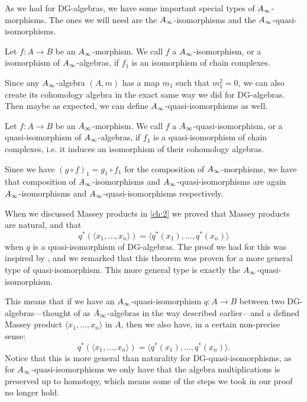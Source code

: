 As we had for DG-algebras, we have some important special types of $\A$-morphisms. The ones we will need are the $\A$-isomorphisms and the $\A$-quasi-isomorphisms.

\begin{definition}[$\A$-isomorphism]
\label{def:A_infinity-isomorphism}
Let $f\colon A\longrightarrow B$ be an $\A$-morphism. We call $f$ a $\A$-isomorphism, or a isomorphism of $\A$-algebras, if $f_1$ is an isomorphism of chain complexes.
\end{definition}

Since any $\A$-algebra $(A, m)$ has a map $m_1$ such that $m_1^2=0$, we can also create its cohomology algebra in the exact same way we did for DG-algebras. Then maybe as expected, we can define $\A$-quasi-isomorphisms as well.

\begin{definition}
\label{def:A_infinity-quasi-isomorphism}
Let $f\colon A\longrightarrow B$ be an $\A$-morphism. We call $f$ a $\A$-quasi-isomorphism, or a quasi-isomorphism of $\A$-algebras, if $f_1$ is a quasi-isomorphism of chain complexes, i.e. it induces an isomorphism of their cohomology algebras. 
\end{definition}

Since we have $(g\circ f)_1 = g_1\circ f_1$ for the composition of $\A$-morphisms, we have that composition of $\A$-isomorphisms and $\A$-quasi-isomorphisms are again $\A$-isomorphisms and $\A$-quasi-isomorphisms respectively.

\begin{remark}
When we discussed Massey products in \cref{ch:2} we proved that Massey products are natural, and that 
\begin{equation*}
	q^*(\langle x_1, \ldots, x_n\rangle ) = \langle q^*(x_1),\ldots, q^*(x_n)\rangle
\end{equation*}
when $q$ is a quasi-isomorphism of DG-algebras. The proof we had for this was inspired by \cite[Theorem 1.5]{naturality}, and we remarked that this theorem was proven for a more general type of quasi-isomorphism. This more general type is exactly the $\A$-quasi-isomorphism.

This means that if we have an $\A$-quasi-isomorphism $q\colon A\longrightarrow B$ between two DG-algebras---thought of as $\A$-algebras in the way described earlier---and a defined Massey product $\langle x_1, \ldots, x_n\rangle$ in $A$, then we also have, in a certain non-precise sense:
\begin{equation*}
	q^*(\langle x_1, \ldots, x_n\rangle ) = \langle q^*(x_1),\ldots, q^*(x_n)\rangle .
\end{equation*}
Notice that this is more general than naturality for DG-quasi-isomorphisms, as for $\A$-quasi-isomorphisms we only have that the algebra multiplications is preserved up to homotopy, which means some of the steps we took in our proof no longer hold. 
\end{remark}




